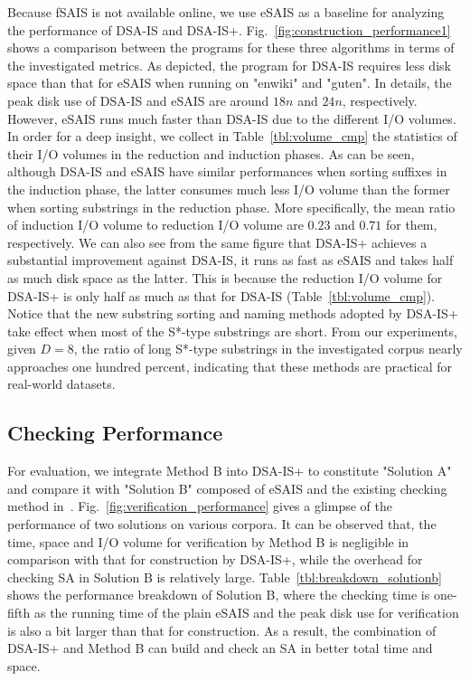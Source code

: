 \documentclass[10pt,journal,compsoc]{IEEEtran}
\begin{document}
{Because fSAIS is not available online, we use eSAIS as a baseline for analyzing the performance of DSA-IS and DSA-IS+. Fig.~\ref{fig:construction_performance1} shows a comparison between the programs for these three algorithms in terms of the investigated metrics. As depicted, the program for DSA-IS requires less disk space than that for eSAIS when running on "enwiki" and "guten". In details, the peak disk use of DSA-IS and eSAIS are around $18n$ and $24n$, respectively. However, eSAIS runs much faster than DSA-IS due to the different I/O volumes. In order for a deep insight, we collect in Table~\ref{tbl:volume_cmp} the statistics of their I/O volumes in the reduction and induction phases. As can be seen, although DSA-IS and eSAIS have similar performances when sorting suffixes in the induction phase, the latter consumes much less I/O volume than the former when sorting substrings in the reduction phase. More specifically, the mean ratio of induction I/O volume to reduction I/O volume are $0.23$ and $0.71$ for them, respectively. We can also see from the same figure that DSA-IS+ achieves a substantial improvement against DSA-IS, it runs as fast as eSAIS and takes half as much disk space as the latter. This is because the reduction I/O volume for DSA-IS+ is only half as much as that for DSA-IS (Table~\ref{tbl:volume_cmp}). Notice that the new substring sorting and naming methods adopted by DSA-IS+ take effect when most of the S*-type substrings are short. From our experiments, given $D = 8$, the ratio of long S*-type substrings in the investigated corpus nearly approaches one hundred percent, indicating that these methods are practical for real-world datasets.

\subsection{Checking Performance}

For evaluation, we integrate Method B into DSA-IS+ to constitute "Solution A" and compare it with "Solution B" composed of eSAIS and the existing checking method in~\cite{Dementiev2008a}. Fig.~\ref{fig:verification_performance} gives a glimpse of the performance of two solutions on various corpora. It can be observed that, the time, space and I/O volume for verification by Method B is negligible in comparison with that for construction by DSA-IS+, while the overhead for checking SA in Solution B is relatively large. Table~\ref{tbl:breakdown_solutionb} shows the performance breakdown of Solution B, where the checking time is one-fifth as the running time of the plain eSAIS and the peak disk use for verification is also a bit larger than that for construction. As a result, the combination of DSA-IS+ and Method B can build and check an SA in better total time and space.

}
\end{document}
